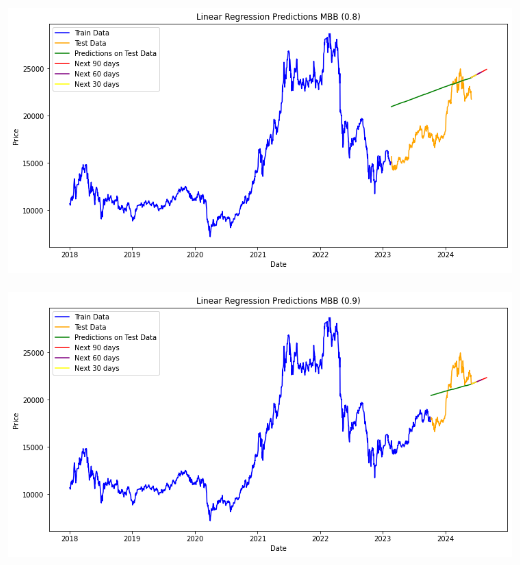 \documentclass[conference]{IEEEtran}
\begin{document}
\begin{minipage}{0.23\textwidth}
    \centering
    \includegraphics[width=\linewidth]{images/LR/LR_MBB_82.png}
    \label{fig:image1}
\end{minipage}
\hfill
\begin{minipage}{0.23\textwidth}
    \centering
    \includegraphics[width=\linewidth]{images/LR/LR_MBB_91.png}
    \label{fig:image2}
\end{minipage}
\end{document}
